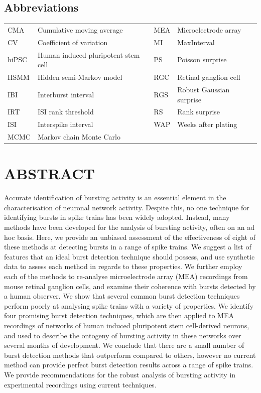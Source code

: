 \documentclass[12pt, titlepage]{article}
\begin{document}
	\subsection*{Abbreviations}
	\begin{tabular}{llll}
		\hline
		CMA & Cumulative moving average & MEA & Microelectrode array 
		\\CV & Coefficient of variation &  	MI & MaxInterval
		\\hiPSC & Human induced pluripotent stem cell & PS &  Poisson surprise								 
		\\HSMM &  Hidden semi-Markov model \ \ \ &  RGC & Retinal ganglion cell
		\\ IBI &  Interburst interval& RGS & Robust Gaussian surprise
		\\IRT & ISI rank threshold &	RS & Rank surprise
		\\ ISI & Interspike interval & WAP & Weeks after plating
		\\ MCMC & Markov chain Monte Carlo
		\\ \hline
	\end{tabular}
	\section*{ABSTRACT}
	Accurate identification of bursting activity is an essential element in the characterisation of neuronal network activity. Despite this, no one technique for identifying bursts in spike trains has been widely adopted. Instead, many methods have been developed for the analysis of bursting activity, often on an ad hoc basis. Here, we provide an unbiased assessment of the effectiveness of eight of these methods at detecting bursts in a range of spike trains. We suggest a list of features that an ideal burst detection technique should possess, and use synthetic data to assess each method in regards to these properties. We further employ each of the methods to re-analyse microelectrode array (MEA) recordings from mouse retinal ganglion cells, and examine their coherence with bursts detected by a human observer. We show that several common burst detection techniques perform poorly at analysing spike trains with a variety of properties. We identify four promising burst detection techniques, which are then applied to MEA recordings of networks of human induced pluripotent stem cell-derived neurons, and used to describe the ontogeny of bursting activity in these networks over several months of development. We conclude that there are a small number of burst detection methods that outperform compared to others, however no current method can provide perfect burst detection results across a range of spike trains. We provide recommendations for the robust analysis of bursting activity in experimental recordings using current techniques.
\end{document}
